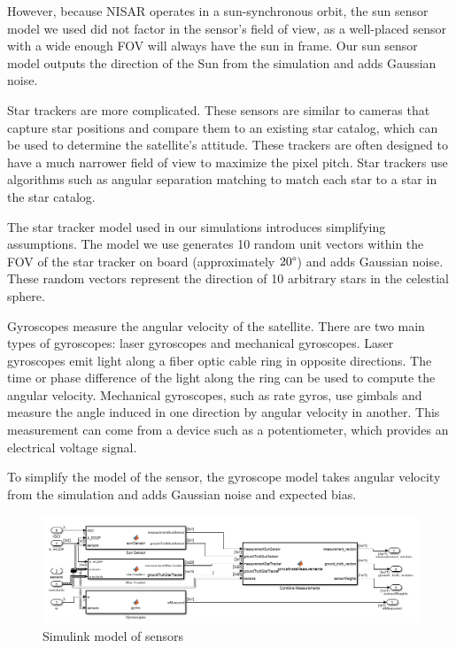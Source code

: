 However, because NISAR operates in a sun-synchronous orbit, the sun sensor model we used did not factor in the sensor's field of view, as a well-placed sensor with a wide enough FOV will always have the sun in frame. Our sun sensor model outputs the direction of the Sun from the simulation and adds Gaussian noise.

Star trackers are more complicated. These sensors are similar to cameras that capture star positions and compare them to an existing star catalog, which can be used to determine the satellite's attitude. These trackers are often designed to have a much narrower field of view to maximize the pixel pitch. Star trackers use algorithms such as angular separation matching to match each star to a star in the star catalog.

The star tracker model used in our simulations introduces simplifying assumptions. The model we use generates 10 random unit vectors within the FOV of the star tracker on board (approximately $20 \degree$) and adds Gaussian noise. These random vectors represent the direction of 10 arbitrary stars in the celestial sphere.

Gyroscopes measure the angular velocity of the satellite. There are two main types of gyroscopes: laser gyroscopes and mechanical gyroscopes. Laser gyroscopes emit light along a fiber optic cable ring in opposite directions. The time or phase difference of the light along the ring can be used to compute the angular velocity. Mechanical gyroscopes, such as rate gyros, use gimbals and measure the angle induced in one direction by angular velocity in another. This measurement can come from a device such as a potentiometer, which provides an electrical voltage signal.

To simplify the model of the sensor, the gyroscope model takes angular velocity from the simulation and adds Gaussian noise and expected bias.

\begin{figure}[H]
\centering
\includegraphics[scale=0.59]{Images/ps7_problem4_simulink.png}
\caption{Simulink model of sensors}
\label{fig:ps7_problem4_simulink}
\end{figure}

